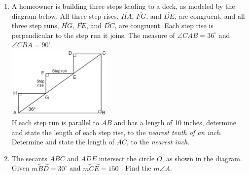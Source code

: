 \documentclass[12pt, twoside]{article}
\begin{document}
\begin{enumerate}
  \newpage

    \item A homeowner is building three steps leading to a deck, as modeled by the diagram below. All three step rises, $\overline{HA}$,  $\overline{FG}$, and  $\overline{DE}$, are congruent, and all three step runs, $\overline{HG}$,  $\overline{FE}$, and  $\overline{DC}$, are congruent. Each step rise is perpendicular to the step run it joins. The measure of $\angle CAB = 36^\circ$ and $\angle CBA = 90^\circ$.\\[0.5cm]
      \includegraphics[width=0.4\textwidth]{steps_Aug2018-33.png}\\
    If each step run is parallel to $\overline{AB}$ and has a length of 10 inches, determine and state the length of each step rise, to the \emph{nearest tenth of an inch}.\\[3cm]
    Determine and state the length of $\overline{AC}$, to the \emph{nearest inch}.

  \item The secants $\overline{ABC}$ and $\overline{ADE}$ intersect the circle $O$, as shown in the diagram. \\Given $m \wideparen{BD}=30^\circ$ and $m \wideparen{CE}=150^\circ$. Find the $m\angle A$.
       \begin{center}
      \end{center} \vspace{1cm}


\end{enumerate}
\end{document}
